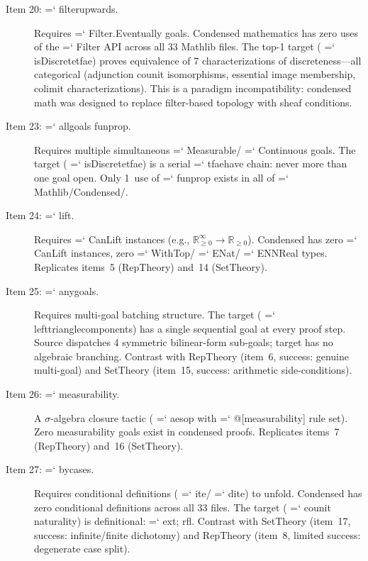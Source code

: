 \documentclass[11pt]{article}
\renewcommand{\texttt}[1]{%
  \begingroup\ttfamily\hyphenchar\font=`\-\relax
  \def\_{\textunderscore\discretionary{}{}{}}%
  #1\endgroup}
\theoremstyle{definition}
\theoremstyle{remark}
\begin{document}
\begin{description}
\item[Item 20: \texttt{filter\_upwards}.]
  Requires \texttt{Filter.Eventually} goals.  Condensed mathematics
  has zero uses of the \texttt{Filter} API across all 33 Mathlib
  files.  The top-1 target (\texttt{isDiscrete\_tfae}) proves
  equivalence of 7 characterizations of discreteness---all
  categorical (adjunction counit isomorphisms, essential image
  membership, colimit characterizations).  This is a paradigm
  incompatibility: condensed math was designed to replace
  filter-based topology with sheaf conditions.

\item[Item 23: \texttt{all\_goals fun\_prop}.]
  Requires multiple simultaneous \texttt{Measurable}/\texttt{Continuous}
  goals.  The target (\texttt{isDiscrete\_tfae}) is a serial
  \texttt{tfae\_have} chain: never more than one goal open.
  Only 1~use of \texttt{fun\_prop} exists in all of
  \texttt{Mathlib/Condensed/}.

\item[Item 24: \texttt{lift}.]
  Requires \texttt{CanLift} instances (e.g.,
  $\mathbb{R}_{\geq 0}^\infty \to \mathbb{R}_{\geq 0}$).
  Condensed has zero \texttt{CanLift} instances, zero
  \texttt{WithTop}/\texttt{ENat}/\texttt{ENNReal} types.
  Replicates items~5 (RepTheory) and~14 (SetTheory).

\item[Item 25: \texttt{any\_goals}.]
  Requires multi-goal batching structure.  The target
  (\texttt{left\_triangle\_components}) has a single sequential
  goal at every proof step.  Source dispatches 4 symmetric
  bilinear-form sub-goals; target has no algebraic branching.
  Contrast with RepTheory (item~6, success: genuine multi-goal)
  and SetTheory (item~15, success: arithmetic side-conditions).

\item[Item 26: \texttt{measurability}.]
  A $\sigma$-algebra closure tactic (\texttt{aesop} with
  \texttt{@[measurability]} rule set).  Zero measurability goals
  exist in condensed proofs.  Replicates items~7 (RepTheory)
  and~16 (SetTheory).

\item[Item 27: \texttt{by\_cases}.]
  Requires conditional definitions (\texttt{ite}/\texttt{dite})
  to unfold.  Condensed has zero conditional definitions across
  all 33 files.  The target (\texttt{counit} naturality) is
  definitional: \texttt{ext; rfl}.  Contrast with SetTheory
  (item~17, success: infinite/finite dichotomy) and RepTheory
  (item~8, limited success: degenerate case split).


\end{description}
\end{document}
